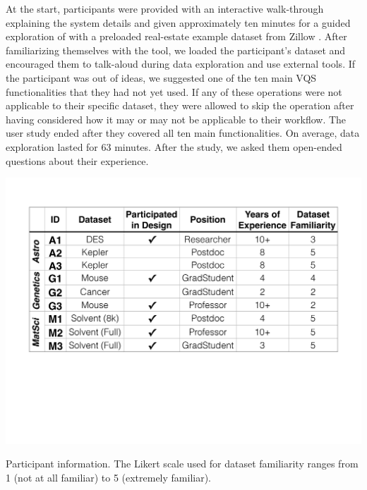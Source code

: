\par At the start, participants were provided with an interactive walk-through explaining the system details and given approximately ten minutes for a guided exploration of \zvpp with a preloaded real-estate example dataset from Zillow \cite{zillow}. After familiarizing themselves with the tool, we loaded the participant's dataset and encouraged them to talk-aloud during data exploration and use external tools. If the participant was out of ideas, we suggested one of the ten main VQS functionalities that they had not yet used. If any of these operations were not applicable to their specific dataset, they were allowed to skip the operation after having considered how it may or may not be applicable to their workflow. The user study ended after they covered all ten main functionalities. On average, data exploration lasted for 63 minutes. After the study, we asked them open-ended questions about their experience.%
\begin{table}[h!]
\centering
\vspace{-10pt}
\includegraphics[width=\linewidth]{figures/participant_info.pdf}
\caption{Participant information. The Likert scale used for dataset familiarity ranges from 1 (not at all familiar) to 5 (extremely familiar).}
\label{participants}
\vspace{-15pt}
\end{table}